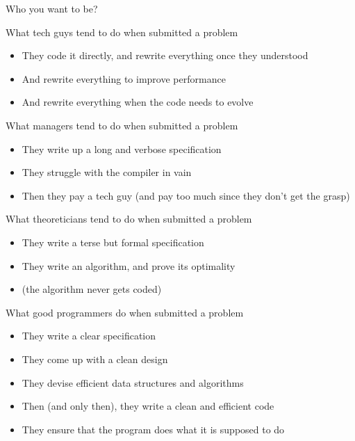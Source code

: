 \begin{frame}[squeeze]{Who you want to be?}
  ~\vspace{-1.5\baselineskip}
  \begin{block}{What tech guys tend to do when submitted a problem}
    \vspace{-.4\baselineskip}
    \begin{itemize}
    \item They code it directly, and rewrite everything once they
      understood
    \item And rewrite everything to improve performance
    \item And rewrite everything when the code needs to evolve
    \end{itemize}
  \end{block}\vspace{-.6\baselineskip}

  \begin{block}{What managers tend to do when submitted a problem}
    \vspace{-.4\baselineskip}
    \begin{itemize}
    \item They write up a long and verbose specification
    \item They struggle with the compiler in vain
    \item Then they pay a tech guy 
      {\small(and pay too much since they don't get the grasp)}
    \end{itemize}
  \end{block}\vspace{-.6\baselineskip}

  \begin{block}{What theoreticians tend to do when submitted a problem}
    \vspace{-.4\baselineskip}
    \begin{itemize}
    \item They write a terse but formal specification
    \item They write an algorithm, and prove its optimality
    \item[] (the algorithm never gets coded)
    \end{itemize}
  \end{block}\vspace{-.6\baselineskip}

  \begin{block}{What good programmers do when submitted a problem}
    \vspace{-.4\baselineskip}
    \begin{itemize}
    \item They write a clear specification
    \item They come up with a clean design
    \item They devise efficient data structures and algorithms
    \item Then (and only then), they write a clean and efficient code
    \item They ensure that the program does what it is supposed to do
    \end{itemize}
  \end{block}
\end{frame}

